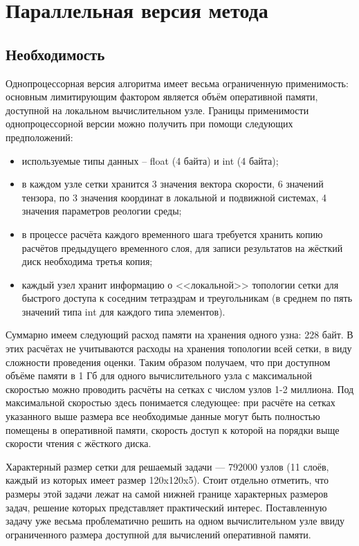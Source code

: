 \section{Параллельная версия метода}
\subsection{Необходимость}
Однопроцессорная версия алгоритма имеет весьма ограниченную применимость: основным лимитирующим фактором является объём оперативной памяти, доступной на локальном вычислительном узле. Границы применимости однопроцессорной версии можно получить при помощи следующих предположений:
\begin{itemize}
	\item используемые типы данных -- float (4 байта) и int (4 байта);
	\item в каждом узле сетки хранится 3 значения вектора скорости, 6 значений тензора, по 3 значения координат в локальной и подвижной системах, 4 значения параметров реологии среды;
	\item в процессе расчёта каждого временного шага требуется хранить копию расчётов предыдущего временного слоя, для записи результатов на жёсткий диск необходима третья копия;
	\item каждый узел хранит информацию о <<локальной>> топологии сетки для быстрого доступа к соседним тетраэдрам и треугольникам (в среднем по пять значений типа int для каждого типа элементов).
\end{itemize}

Суммарно имеем следующий расход памяти на хранения одного узна: 228 байт. В этих расчётах не учитываются расходы на хранения топологии всей сетки, в виду сложности проведения оценки. Таким образом получаем, что при доступном объёме памяти в 1 Гб для одного вычислительного узла с максимальной скоростью можно проводить расчёты на сетках с числом узлов 1-2 миллиона. Под максимальной скоростью здесь понимается следующее: при расчёте на сетках указанного выше размера все необходимые данные могут быть полностью помещены в оперативной памяти, скорость доступ к которой на порядки выще скорости чтения с жёсткого диска.

Характерный размер сетки для решаемый задачи —  792000 узлов (11 слоёв, каждый из которых имеет размер 120x120x5). Стоит отдельно отметить, что размеры этой задачи лежат на самой нижней границе характерных размеров задач, решение которых представляет практический интерес. Поставленную задачу уже весьма проблематично решить на одном вычислительном узле ввиду ограниченного размера доступной для вычислений оперативной памяти.

